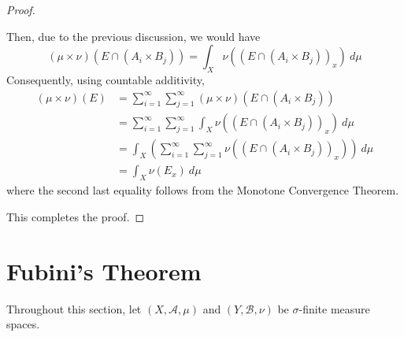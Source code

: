 \begin{proof}
\begin{enumerate}[label=(\alph*)]
Then, due to the previous discussion, we would have 
\begin{equation*}
    (\mu\times\nu)(E\cap(A_i\times B_j)) = \int_X\nu((E\cap(A_i\times B_j))_x)~d\mu
\end{equation*}
Consequently, using countable additivity, 
\begin{align*}
    (\mu\times\nu)(E) &= \sum_{i = 1}^\infty\sum_{j = 1}^\infty(\mu\times\nu)(E\cap(A_i\times B_j))\\
    &= \sum_{i = 1}^\infty\sum_{j = 1}^\infty\int_X\nu((E\cap(A_i\times B_j))_x)~d\mu\\
    &= \int_X\left(\sum_{i = 1}^\infty\sum_{j = 1}^\infty\nu((E\cap(A_i\times B_j))_x)\right)~d\mu\\
    &= \int_X\nu(E_x)~d\mu
\end{align*}
where the second last equality follows from the Monotone Convergence Theorem.
\end{enumerate}
This completes the proof.
\end{proof}

\section{Fubini's Theorem}
Throughout this section, let $(X,\mathscr A,\mu)$ and $(Y,\mathscr B,\nu)$ be $\sigma$-finite measure spaces.

